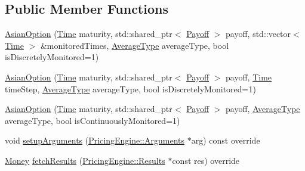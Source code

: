 \subsection*{Public Member Functions}
\begin{DoxyCompactItemize}
\item 
\hyperlink{class_asian_option_aa4020dfa8edd8d1e8f2756b633b3828b}{Asian\+Option} (\hyperlink{_name_def_8h_ac2d3e0ba793497bcca555c7c2cf64ff3}{Time} maturity, std\+::shared\+\_\+ptr$<$ \hyperlink{class_payoff}{Payoff} $>$ payoff, std\+::vector$<$ \hyperlink{_name_def_8h_ac2d3e0ba793497bcca555c7c2cf64ff3}{Time} $>$ \&monitored\+Times, \hyperlink{class_asian_option_add7292791bf85820ff9fdbfd4407f3b9}{Average\+Type} average\+Type, bool is\+Discretely\+Monitored=1)
\item 
\hyperlink{class_asian_option_a055f90a9d85eac93bac28cc9901489af}{Asian\+Option} (\hyperlink{_name_def_8h_ac2d3e0ba793497bcca555c7c2cf64ff3}{Time} maturity, std\+::shared\+\_\+ptr$<$ \hyperlink{class_payoff}{Payoff} $>$ payoff, \hyperlink{_name_def_8h_ac2d3e0ba793497bcca555c7c2cf64ff3}{Time} time\+Step, \hyperlink{class_asian_option_add7292791bf85820ff9fdbfd4407f3b9}{Average\+Type} average\+Type, bool is\+Discretely\+Monitored=1)
\item 
\hyperlink{class_asian_option_af6dc588a9183209493caf9eb7eb5e572}{Asian\+Option} (\hyperlink{_name_def_8h_ac2d3e0ba793497bcca555c7c2cf64ff3}{Time} maturity, std\+::shared\+\_\+ptr$<$ \hyperlink{class_payoff}{Payoff} $>$ payoff, \hyperlink{class_asian_option_add7292791bf85820ff9fdbfd4407f3b9}{Average\+Type} average\+Type, bool is\+Continuously\+Monitored=1)
\item 
void \hyperlink{class_asian_option_a475cbd83529df369b371ee44f63cdd08}{setup\+Arguments} (\hyperlink{class_pricing_engine_1_1_arguments}{Pricing\+Engine\+::\+Arguments} $\ast$arg) const override
\item 
\hyperlink{_name_def_8h_a5a9d48c16a694e9a2d9f1eca730dc8c5}{Money} \hyperlink{class_asian_option_a99cd9956b73d99a64748c913dcccd6ea}{fetch\+Results} (\hyperlink{class_pricing_engine_1_1_results}{Pricing\+Engine\+::\+Results} $\ast$const res) override
\end{DoxyCompactItemize}
